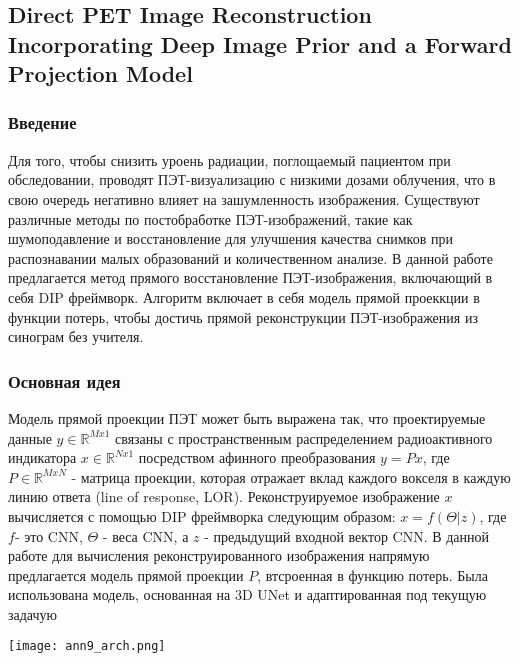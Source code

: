\subsection*{Direct PET Image Reconstruction Incorporating Deep Image Prior and a Forward Projection Model}
\subsubsection*{Введение}
Для того, чтобы снизить уроень радиации, поглощаемый пациентом при обследовании, 
проводят ПЭТ-визуализацию с низкими дозами облучения, что в свою очередь негативно влияет на 
зашумленность изображения. Существуют различные методы по постобработке ПЭТ-изображений,
такие как шумоподавление и восстановление для улучшения качества снимков при распознавании 
малых образований и количественном анализе. В данной работе \cite{ann9} предлагается метод
прямого восстановление ПЭТ-изображения, включающий в себя DIP фреймворк.
Алгоритм включает в себя модель прямой проеккции в функции потерь, чтобы достичь 
прямой реконструкции ПЭТ-изображения из синограм без учителя. 
\subsubsection*{Основная идея}
Модель прямой проекции ПЭТ может быть выражена так, что проектируемые данные \(y\in\mathbb{R}^{Mx1}\) связаны 
с пространственным распределением радиоактивного индикатора \(x\in\mathbb{R}^{Nx1}\) посредством афинного 
преобразования \(y=Px\), где \(P\in\mathbb{R}^{MxN}\) - матрица проекции, которая 
отражает вклад каждого вокселя в каждую линию ответа (line of response, LOR).
Реконструируемое изображение \(x\) вычисляется с помощью DIP фреймворка
следующим образом: \(x=f(\Theta|z)\), где \(f\)- это CNN, \(\Theta\) - веса CNN, а 
\(z\) - предыдущий входной вектор CNN. В данной работе для вычисления реконструированного 
изображения напрямую предлагается модель прямой проекции \(P\), втсроенная в функцию потерь. Была 
использована модель, основанная на 3D UNet и адаптированная под текущую задачую

\begin{minipage}{1.0\linewidth}
    \begin{center}
        \texttt{[image: ann9\_arch.png]} \\
    \end{center}
    
\end{minipage}

